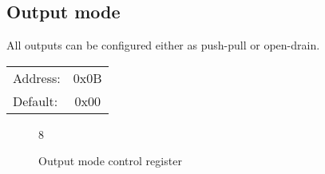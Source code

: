 \documentclass{article}
\begin{document}
	\subsection{Output mode}

	All outputs can be configured either as push-pull or open-drain.

	\begin{tabular}{ l c }
		Address: & 0x0B \\
		Default: & 0x00 \\
	\end{tabular}

	\begin{figure}[H]
		\centering
		\begin{bytefield}[
			bitwidth=0.1\linewidth]{8}
			 \\
		\end{bytefield}
		\caption{Output mode control register}
		\label{reg:output_mode}
	\end{figure}
\end{document}
